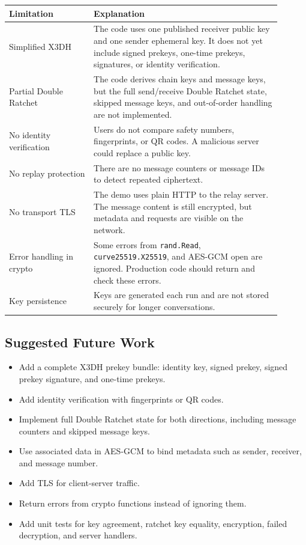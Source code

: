 \documentclass[12pt,a4paper]{article}
\begin{document}
\begin{longtable}{p{0.28\linewidth} p{0.62\linewidth}}
\toprule
\textbf{Limitation} & \textbf{Explanation} \\
\midrule
Simplified X3DH & The code uses one published receiver public key and one sender ephemeral key. It does not yet include signed prekeys, one-time prekeys, signatures, or identity verification. \\
Partial Double Ratchet & The code derives chain keys and message keys, but the full send/receive Double Ratchet state, skipped message keys, and out-of-order handling are not implemented. \\
No identity verification & Users do not compare safety numbers, fingerprints, or QR codes. A malicious server could replace a public key. \\
No replay protection & There are no message counters or message IDs to detect repeated ciphertext. \\
No transport TLS & The demo uses plain HTTP to the relay server. The message content is still encrypted, but metadata and requests are visible on the network. \\
Error handling in crypto & Some errors from \texttt{rand.Read}, \texttt{curve25519.X25519}, and AES-GCM open are ignored. Production code should return and check these errors. \\
Key persistence & Keys are generated each run and are not stored securely for longer conversations. \\
\bottomrule
\end{longtable}

\subsection{Suggested Future Work}

\begin{itemize}
    \item Add a complete X3DH prekey bundle: identity key, signed prekey, signed prekey signature, and one-time prekeys.
    \item Add identity verification with fingerprints or QR codes.
    \item Implement full Double Ratchet state for both directions, including message counters and skipped message keys.
    \item Use associated data in AES-GCM to bind metadata such as sender, receiver, and message number.
    \item Add TLS for client-server traffic.
    \item Return errors from crypto functions instead of ignoring them.
    \item Add unit tests for key agreement, ratchet key equality, encryption, failed decryption, and server handlers.
\end{itemize}
\end{document}
